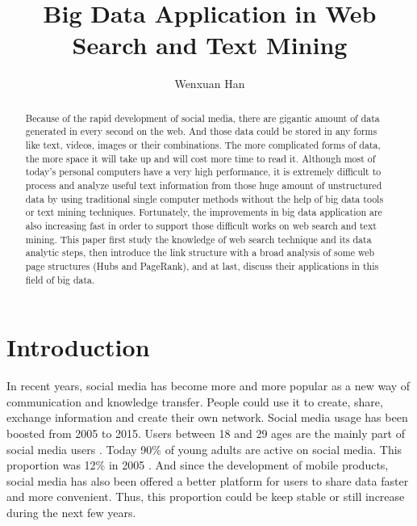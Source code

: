 \documentclass[sigconf]{acmart}
\begin{document}
\title{Big Data Application in Web Search and Text Mining}


\author{Wenxuan Han}



\begin{abstract}
Because of the rapid development of social media, there are gigantic amount of data generated in every second on the web. And those data could be stored in any forms like text, videos, images or their combinations. The more complicated forms of data, the more space it will take up and will cost more time to read it. Although most of today's personal computers have a very high performance, it is extremely difficult to process and analyze useful text information from those huge amount of unstructured data by using traditional single computer methods without the help of big data tools or text mining techniques. Fortunately, the improvements in big data application are also increasing fast in order to support those difficult works on web search and text mining. This paper first study the knowledge of web search technique and its data analytic steps, then introduce the link structure with a broad analysis of some web page structures (Hubs and PageRank), and at last, discuss their applications in this field of big data.
\end{abstract}



\maketitle

\section{Introduction}

In recent years, social media has become more and more popular as a new way of communication and knowledge transfer. People could use it to create, share, exchange information and create their own network. Social media usage has been boosted from 2005 to 2015. Users between 18 and 29 ages are the mainly part of social media users \cite{editor01}. Today 90\% of young adults are active on social media. This proportion was 12\% in 2005 \cite{editor02}. And since the development of mobile products, social media has also been offered a better platform for users to share data faster and more convenient. Thus, this proportion could be keep stable or still increase during the next few years.
\end{document}
